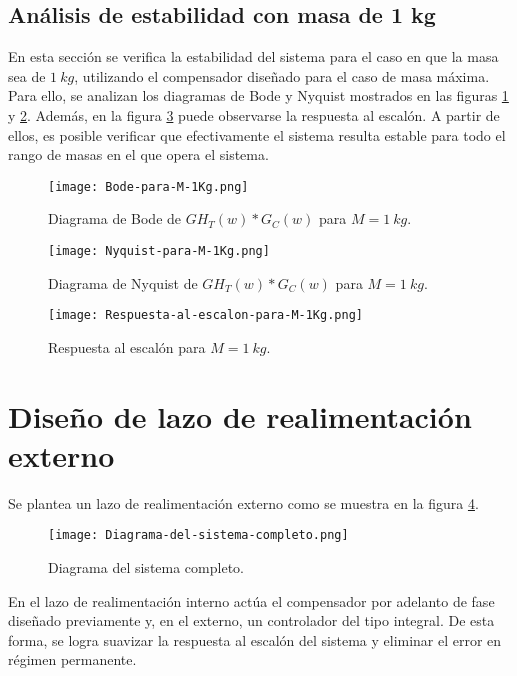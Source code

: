 \subsection{Análisis de estabilidad con masa de 1 kg}

\noindent En esta secci\'{o}n se verifica la estabilidad del sistema  para el caso en que la masa sea de $1\:kg$, utilizando el compensador dise\~{n}ado para el caso de masa m\'{a}xima. Para ello, se analizan los diagramas de Bode y Nyquist mostrados en las figuras \ref{fig:bode-para-M-1Kg} y \ref{fig:nyquist-para-M-1Kg}. Adem\'{a}s, en la figura \ref{fig:respuesta-al-escalon-para-M-1Kg} puede observarse la respuesta al escal\'{o}n. A partir de ellos, es posible verificar que efectivamente el sistema resulta estable para todo el rango de masas en el que opera el sistema. 


\begin{figure}[H]
	\centering
	\texttt{[image: Bode-para-M-1Kg.png]}
	\caption{Diagrama de Bode de $GH_T(w)*G_C(w)$ para $M=1\:kg$.}
	\label{fig:bode-para-M-1Kg}
\end{figure}

\begin{figure}[H]
	\centering
	\texttt{[image: Nyquist-para-M-1Kg.png]}
	\caption{Diagrama de Nyquist de $GH_T(w)*G_C(w)$ para $M=1\:kg$.}
	\label{fig:nyquist-para-M-1Kg}
\end{figure}

\begin{figure}[H]
	\centering
	\texttt{[image: Respuesta-al-escalon-para-M-1Kg.png]}
	\caption{Respuesta al escalón para $M=1\:kg$.}
	\label{fig:respuesta-al-escalon-para-M-1Kg}
\end{figure}

\section{Diseño de lazo de realimentación externo}

\noindent Se plantea un lazo de realimentaci\'{o}n externo como se muestra en la  figura \ref{fig:diagrama-del-sistema-completo}.

\begin{figure}[H]
	\centering
	\texttt{[image: Diagrama-del-sistema-completo.png]}
	\caption{Diagrama del sistema completo.}
	\label{fig:diagrama-del-sistema-completo}
\end{figure}


\noindent En el lazo de realimentaci\'{o}n interno act\'{u}a el compensador por adelanto de fase dise\~{n}ado previamente y, en el externo, un controlador del tipo integral. De esta forma, se logra suavizar la respuesta al escal\'{o}n del sistema y eliminar el error en r\'{e}gimen permanente.


